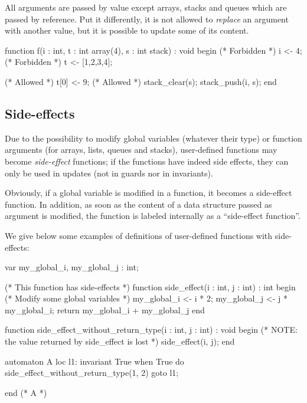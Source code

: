All arguments are passed by value except arrays, stacks and queues which are passed by reference.
Put it differently, it is not allowed to \emph{replace} an argument with another value, but it is possible to update some of its content.

\begin{IMITATORmodel}
function f(i : int, t : int array(4), s : int stack) : void
begin
	(* Forbidden *)
 	i <- 4;
	(* Forbidden *)
 	t <- [1,2,3,4];

	(* Allowed *)
	t[0] <- 9;
	(* Allowed *)
	stack_clear(s);
	stack_push(i, s);
end
\end{IMITATORmodel}




\subsection{Side-effects}

Due to the possibility to modify global variables (whatever their type) or function arguments (for arrays, lists, queues and stacks), user-defined functions may become \emph{side-effect} functions; if the functions have indeed side effects, they can only be used in updates (not in guards nor in invariants).

Obviously, if a global variable is modified in a function, it becomes a side-effect function.
In addition, as soon as the content of a data structure passed as argument is modified, the function is labeled internally as a ``side-effect function''.





\begin{example}\label{example:functions-side-effects-void}
We give below some examples of definitions of user-defined functions with side-effects:

\begin{IMITATORmodel}
var
	my_global_i, my_global_j : int;

(* This function has side-effects *)
function side_effect(i : int, j : int) : int
begin
	(* Modify some global variables *)
	my_global_i <- i * 2;
	my_global_j <- j * my_global_i;
	return my_global_i + my_global_j
end

function side_effect_without_return_type(i : int, j : int) : void
begin
	(* NOTE: the value returned by side_effect is lost *)
	side_effect(i, j);
end

automaton A
loc l1: invariant True
	when True do {side_effect_without_return_type(1, 2)} goto l1;

end (* A *)
\end{IMITATORmodel}
\end{example}


